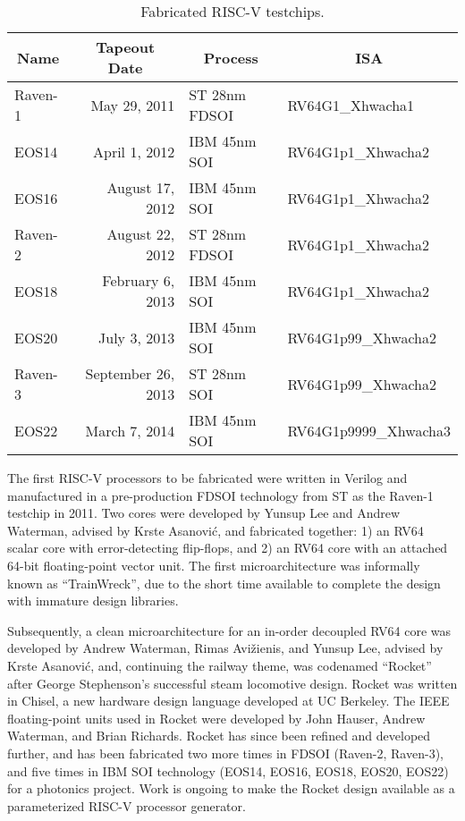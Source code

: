 \begin{table*}[!h]
\begin{center}
\begin{tabular}{|l|r|l|l|}
\hline
\multicolumn{1}{|c|}{Name} & \multicolumn{1}{|c|}{Tapeout Date} & \multicolumn{1}{|c|}{Process} & \multicolumn{1}{|c|}{ISA} \\ \hline
\hline
Raven-1 & May 29, 2011 & ST 28nm FDSOI & RV64G1\_Xhwacha1 \\ \hline
EOS14 & April 1, 2012 & IBM 45nm SOI & RV64G1p1\_Xhwacha2 \\ \hline
EOS16 & August 17, 2012 & IBM 45nm SOI & RV64G1p1\_Xhwacha2 \\ \hline
Raven-2 & August 22, 2012 & ST 28nm FDSOI & RV64G1p1\_Xhwacha2 \\ \hline
EOS18 & February 6, 2013 & IBM 45nm SOI & RV64G1p1\_Xhwacha2 \\ \hline
EOS20 & July 3, 2013 & IBM 45nm SOI & RV64G1p99\_Xhwacha2 \\ \hline
Raven-3 & September 26, 2013 & ST 28nm SOI & RV64G1p99\_Xhwacha2 \\ \hline
EOS22 & March 7, 2014 & IBM 45nm SOI & RV64G1p9999\_Xhwacha3 \\ \hline
\end{tabular}
\end{center}
\vspace{-0.15in}
\caption{Fabricated RISC-V testchips.}
\label{silicon}
\end{table*}

The first RISC-V processors to be fabricated were written in Verilog and
manufactured in a pre-production  FDSOI technology from
ST as the Raven-1 testchip in 2011.  Two cores were developed by Yunsup
Lee and Andrew Waterman, advised by Krste Asanovi\'{c}, and fabricated
together: 1) an RV64 scalar core with error-detecting flip-flops, and 2)
an RV64 core with an attached 64-bit floating-point vector unit.  The
first microarchitecture was informally known as ``TrainWreck'', due to
the short time available to complete the design with immature design
libraries.

Subsequently, a clean microarchitecture for an in-order decoupled RV64
core was developed by Andrew Waterman, Rimas Avi\v{z}ienis, and Yunsup
Lee, advised by Krste Asanovi\'{c}, and, continuing the railway theme,
was codenamed ``Rocket'' after George Stephenson's successful steam
locomotive design.  Rocket was written in Chisel, a new hardware
design language developed at UC Berkeley.  The IEEE floating-point
units used in Rocket were developed by John Hauser, Andrew
Waterman, and Brian Richards.
Rocket has since been refined and developed further, and has been
fabricated two more times in  FDSOI (Raven-2, Raven-3),
and five times in IBM  SOI technology (EOS14, EOS16,
EOS18, EOS20, EOS22) for a photonics project.  Work is ongoing to make
the Rocket design available as a parameterized RISC-V processor
generator.

